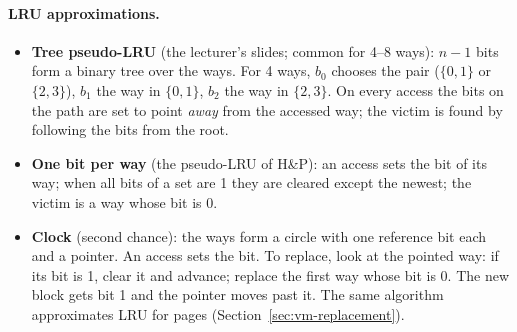 \paragraph{LRU approximations.}
\begin{itemize}
  \item \textbf{Tree pseudo-LRU} (the lecturer's slides; common for 4--8 ways):
  $n-1$ bits form a binary tree over the ways. For 4 ways, $b_0$ chooses the pair
  ($\{0,1\}$ or $\{2,3\}$), $b_1$ the way in $\{0,1\}$, $b_2$ the way in $\{2,3\}$.
  On every access the bits on the path are set to point \emph{away} from the
  accessed way; the victim is found by following the bits from the root.
  \item \textbf{One bit per way} (the pseudo-LRU of H\&P): an access sets the bit
  of its way; when all bits of a set are 1 they are cleared except the newest; the
  victim is a way whose bit is 0.
  \item \textbf{Clock} (second chance): the ways form a circle with one reference
  bit each and a pointer. An access sets the bit. To replace, look at the pointed
  way: if its bit is 1, clear it and advance; replace the first way whose bit is 0.
  The new block gets bit 1 and the pointer moves past it. The same algorithm
  approximates LRU for pages (Section~\ref{sec:vm-replacement}).
\end{itemize}

\begin{center}\begin{minipage}{\linewidth}\centering
{}
\end{minipage}
\end{center}

